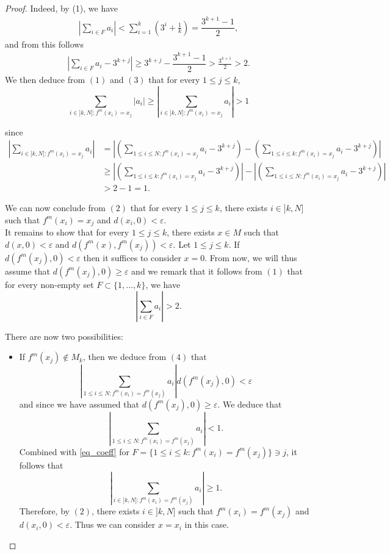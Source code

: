 \documentclass[10pt,a4paper]{amsart}
\begin{document}
\begin{proof}
Indeed, by (1), we have
\begin{align*}
     \left|\sum_{i\in F}a_i\right| < \sum_{i=1}^k\left(3^i+\frac{1}{k}\right)= \dfrac{3^{k+1}-1}{2},
\end{align*}
and from this follows
\begin{align*}
    \left|\sum_{i\in F} a_i-3^{k+j}\right | \geq 3^{k+j}-\dfrac{3^{k+1}-1}{2} >\frac{3^{k+1}}{2}> 2.
\end{align*}
We then deduce from $(1)$ and $(3)$ that for every $1\le j\le k$, 
\[\sum_{i\in ]k,N]:f^m(x_i)=x_j}|a_i|\ge \left|\sum_{i\in ]k,N]:f^m(x_i)=x_j}a_i\right|>1\]

since
\begin{align*}
\left|\sum_{i\in ]k,N]:f^m(x_i)=x_j}a_i\right|&=\left|\left(\sum_{1\le i\le N:f^m(x_i)=x_j}a_i-3^{k+j}\right)-\left(\sum_{1\le i\le k:f^m(x_i)=x_j}a_i-3^{k+j}\right) \right|\\
&\ge \left|\left(\sum_{1\le i\le k:f^m(x_i)=x_j}a_i-3^{k+j}\right) \right|-\left|\left(\sum_{1\le i\le N:f^m(x_i)=x_j}a_i-3^{k+j}\right)\right|\\
&>2-1=1.
\end{align*}


We can now conclude from $(2)$ that for every $1\le j\le k$, there exists $i\in ]k,N]$ such that $f^m(x_i)=x_j$ and $d(x_i,0)<\varepsilon$.\\

It remains to show that for every $1\le j\le k$, there exists $x\in M$ such that $d(x,0)<\varepsilon$  and $d(f^m(x),f^m(x_j))<\varepsilon$.  
Let $1\le j\le k$. 
If $d(f^m(x_j),0)<\varepsilon$ then it suffices to consider $x=0$. From now, we will thus assume that $d(f^m(x_j),0)\ge \varepsilon$ and we remark that it follows from $(1)$ that for every non-empty set $F\subset \{1,\dots,k\}$, we have
\begin{equation}\label{eq_coeff}
    \left|\sum_{i\in F}a_i\right|> 2.
\end{equation}

There are now two possibilities:
\begin{itemize}
\item If $f^m(x_j)\notin M_k$, then we deduce from $(4)$ that 
\[\left|\sum_{1\le i\le N:f^m(x_i)=f^m(x_j)}a_i\right| d(f^m(x_j),0)<\varepsilon\]
and since we have assumed that $d(f^m(x_j),0)\ge \varepsilon$. We deduce that 
\[\left|\sum_{1\le i\le N:f^m(x_i)=f^m(x_j)}a_i\right|<1.\]
Combined with \eqref{eq_coeff} for $F=\{1\le i\le k:f^m(x_i)=f^m(x_j)  \}\ni j$, it follows that  
\[\left|\sum_{i\in ]k,N]:f^m(x_i)=f^m(x_j)}a_i\right|\ge 1.\]
Therefore, by $(2)$, there exists $i\in ]k,N]$ such that $f^m(x_i)=f^m(x_j)$ and $d(x_i,0)<\varepsilon$. Thus we can consider $x=x_i$ in this case.


\end{itemize}
\end{proof}
\end{document}
